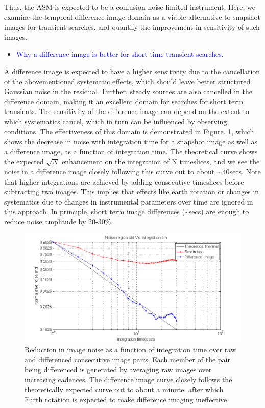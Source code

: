 \documentclass{aa}
\begin{document}
Thus, the ASM is expected to be a confusion noise limited instrument.
Here, we examine the temporal difference image domain as a viable
alternative to snapshot images for transient searches, and quantify
the improvement in sensitivity of such images. 
\begin{itemize}
\item \textcolor{blue}{Why a difference image is better for short time transient
searches.}
\end{itemize}
A difference image is expected to have a higher sensitivity due to
the cancellation of the abovementioned systematic effects, which should
leave better structured Gaussian noise in the residual. Further, steady
sources are also cancelled in the difference domain, making it an
excellent domain for searches for short term transients. The sensitivity
of the difference image can depend on the extent to which systematics
cancel, which in turn can be influenced by observing conditions. The
effectiveness of this domain is demonstrated in Figure. \ref{fig:Reduction-in-image},
which shows the decrease in noise with integration time for a snapshot
image as well as a difference image, as a function of integration
time. The theoretical curve shows the expected $\sqrt{N}$ enhancement
on the integration of N timeslices, and we see the noise in a difference
image closely following this curve out to about $\sim40$secs. Note
that higher integrations are achieved by adding consecutive timeslices
before subtracting two images. This implies that effects like earth
rotation or changes in systematics due to changes in instrumental
parameters over time are ignored in this approach. In principle, short
term image differences (\textasciitilde{}secs) are enough to reduce
noise amplitude by 20-30\%.

\begin{figure}[tbh]
\includegraphics[width=0.9\paperwidth]{Figs/raw_vs_diff_vs_theory}

\caption{\label{fig:Reduction-in-image}Reduction in image noise as a function
of integration time over raw and differenced consecutive image pairs.
Each member of the pair being differenced is generated by averaging
raw images over increasing cadences. The difference image curve closely
follows the theoretically expected curve out to about a minute, after
which Earth rotation is expected to make difference imaging ineffective.}
\end{figure}
\end{document}
